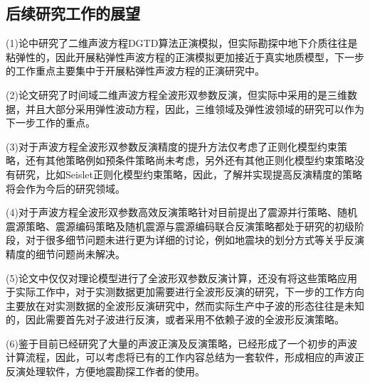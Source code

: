 \documentclass[12pt]{article}
\begin{document}
\subsection{后续研究工作的展望}
(1)论中研究了二维声波方程DGTD算法正演模拟，但实际勘探中地下介质往往是粘弹性的，因此开展粘弹性声波方程的正演模拟更加接近于真实地质模型，下一步的工作重点主要集中于开展粘弹性声波方程的正演研究中。
\par
(2)论文研究了时间域二维声波方程全波形双参数反演，但实际中采用的是三维数据，并且大部分采用弹性波动方程，因此，三维领域及弹性波领域的研究可以作为下一步工作的重点。
\par
(3)对于声波方程全波形双参数反演精度的提升方法仅考虑了正则化模型约束策略，还有其他策略例如预条件策略尚未考虑，另外还有其他正则化模型约束策略没有研究，比如Seislet正则化模型约束策略，因此，了解并实现提高反演精度的策略将会作为今后的研究领域。
\par
(4)对于声波方程全波形双参数高效反演策略针对目前提出了震源并行策略、随机震源策略、震源编码策略及随机震源与震源编码联合反演策略都处于研究的初级阶段，对于很多细节问题未进行更为详细的讨论，例如地震块的划分方式等关乎反演精度的细节问题尚未解决。
\par
(5)论文中仅仅对理论模型进行了全波形双参数反演计算，还没有将这些策略应用于实际工作中，对于实测数据更加需要进行全波形反演的研究，下一步的工作方向主要放在对实测数据的全波形反演研究中，然而实际生产中子波的形态往往是未知的，因此需要首先对子波进行反演，或者采用不依赖子波的全波形反演策略。
\par
(6)鉴于目前已经研究了大量的声波正演及反演策略，已经形成了一个初步的声波计算流程，因此，可以考虑将已有的工作内容总结为一套软件，形成相应的声波正反演处理软件，方便地震勘探工作者的使用。
\newpage
\pagestyle{fancy}
\cfoot{\fancyplain{}{\thepage}}


\newpage
{}
\end{document}
